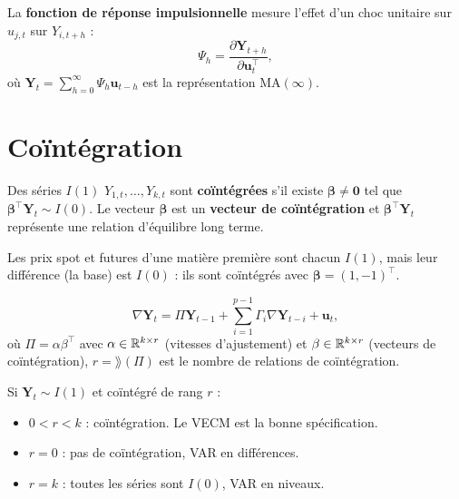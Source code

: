 \begin{definition}[IRF]
La \textbf{fonction de r\'eponse impulsionnelle} mesure l'effet d'un choc unitaire sur $u_{j,t}$ sur $Y_{i,t+h}$ :
\[
\Psi_h = \frac{\partial\bm{Y}_{t+h}}{\partial\bm{u}_t^\top},
\]
o\`u $\bm{Y}_t = \sum_{h=0}^{\infty}\Psi_h\bm{u}_{t-h}$ est la repr\'esentation MA$(\infty)$.
\end{definition}

\section{Co\"int\'egration}

\begin{definition}
Des s\'eries $I(1)$ $Y_{1,t},\ldots,Y_{k,t}$ sont \textbf{co\"int\'egr\'ees} s'il existe $\bm\beta\neq\bm{0}$ tel que $\bm\beta^\top\bm{Y}_t\sim I(0)$. Le vecteur $\bm\beta$ est un \textbf{vecteur de co\"int\'egration} et $\bm\beta^\top\bm{Y}_t$ repr\'esente une relation d'\'equilibre long terme.
\end{definition}

\begin{exemple}
Les prix spot et futures d'une mati\`ere premi\`ere sont chacun $I(1)$, mais leur diff\'erence (la base) est $I(0)$ : ils sont co\"int\'egr\'es avec $\bm\beta=(1,-1)^\top$.
\end{exemple}

\begin{definition}
\[
\nabla\bm{Y}_t = \Pi\bm{Y}_{t-1} + \sum_{i=1}^{p-1}\Gamma_i\nabla\bm{Y}_{t-i} + \bm{u}_t,
\]
o\`u $\Pi=\alpha\beta^\top$ avec $\alpha\in\mathbb{R}^{k\times r}$ (vitesses d'ajustement) et $\beta\in\mathbb{R}^{k\times r}$ (vecteurs de co\"int\'egration), $r=\rang(\Pi)$ est le nombre de relations de co\"int\'egration.
\end{definition}

\begin{theoreme}
Si $\bm{Y}_t\sim I(1)$ et co\"int\'egr\'e de rang $r$ :
\begin{itemize}
\item $0<r<k$ : co\"int\'egration. Le VECM est la bonne sp\'ecification.
\item $r=0$ : pas de co\"int\'egration, VAR en diff\'erences.
\item $r=k$ : toutes les s\'eries sont $I(0)$, VAR en niveaux.
\end{itemize}
\end{theoreme}

